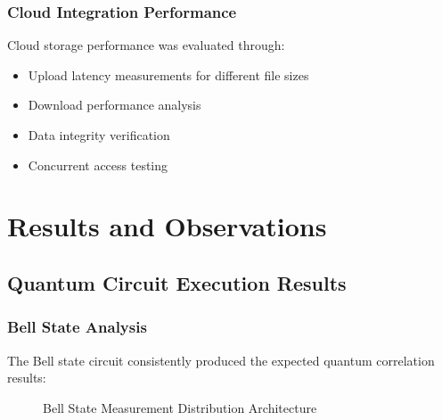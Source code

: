 \documentclass[onecolumn]{IEEEtran}
\begin{document}
\subsubsection{Cloud Integration Performance}

Cloud storage performance was evaluated through:
\begin{itemize}
    \item Upload latency measurements for different file sizes
    \item Download performance analysis
    \item Data integrity verification
    \item Concurrent access testing
\end{itemize}

\section{Results and Observations}

\subsection{Quantum Circuit Execution Results}

\subsubsection{Bell State Analysis}

The Bell state circuit consistently produced the expected quantum correlation results:

\begin{figure}[h]
\centering
{}
\caption{Bell State Measurement Distribution Architecture}
\label{fig:bell_results}
\end{figure}
\end{document}
